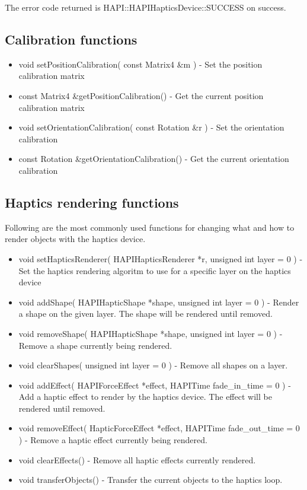 The error code returned is HAPI::HAPIHapticsDevice::SUCCESS on success.

\subsection{Calibration functions}
\begin{itemize}
\item void setPositionCalibration( const Matrix4 \&m ) - Set the
 position calibration matrix
\item const Matrix4 \&getPositionCalibration() - Get the current
 position calibration matrix
\item void setOrientationCalibration( const Rotation \&r ) - Set the
  orientation calibration
\item const Rotation \&getOrientationCalibration() - Get the
  current orientation calibration
\end{itemize}


\subsection{Haptics rendering functions}
\label{ssHapticsRenderingFunctions}
Following are the most commonly used functions for changing what and
how to render objects with the haptics device. 

\begin{itemize} 

\item void setHapticsRenderer( HAPIHapticsRenderer *r, unsigned int
  layer = 0 ) - Set the haptics rendering algoritm to use for a
  specific layer on the haptics device

\item void addShape( HAPIHapticShape *shape, unsigned int layer = 0 )
  - Render a shape on the given layer. The shape will be rendered
  until removed.
\item void removeShape( HAPIHapticShape *shape, unsigned int layer = 0
  ) - Remove a shape currently being rendered.
\item void clearShapes( unsigned int layer = 0 ) - Remove all shapes
  on a layer. 

\item void addEffect( HAPIForceEffect *effect, HAPITime fade\_in\_time = 0 ) - Add a haptic
  effect to render by the haptics device. The effect will be rendered
  until removed.
\item void removeEffect( HapticForceEffect *effect, HAPITime fade\_out\_time = 0 ) - Remove a haptic
  effect currently being rendered.
\item void clearEffects() - Remove all haptic effects currently rendered.
\item void transferObjects() - Transfer the current objects to the haptics loop.
\end{itemize}

